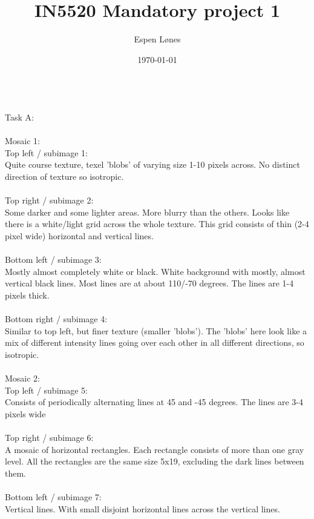 \documentclass[12pt, letterpaper, twoside]{article}
\begin{document}
\title{IN5520 Mandatory project 1}
\author{Espen Lønes}
\date{\today}
\maketitle
\ \\
Task A:\\
\ \\
Mosaic 1:\\
Top left / subimage 1:\\
Quite course texture, texel 'blobs' of varying size 1-10 pixels across. No distinct direction of texture so isotropic.\\
\ \\
Top right / subimage 2:\\
Some darker and some lighter areas. More blurry than the others. Looks like there is a white/light grid across the whole texture. This grid consists of thin (2-4 pixel wide) horizontal and vertical lines.\\
\ \\ 
Bottom left / subimage 3:\\
Mostly almost completely white or black. White background with mostly, almost vertical black lines. Most lines are at about 110/-70 degrees. The lines are 1-4 pixels thick.\\
\ \\    
Bottom right / subimage 4:\\
Similar to top left, but finer texture (smaller 'blobs'). The 'blobs' here look like a mix of different intensity lines going over each other in all different directions, so isotropic.\\
\newpage
\ \\
Mosaic 2:\\
Top left / subimage 5:\\
Consists of periodically alternating lines at 45 and -45 degrees. The lines are 3-4 pixels wide\\
\ \\
Top right / subimage 6:\\
A mosaic of horizontal rectangles. Each rectangle consists of more than one gray level. All the rectangles are the same size 5x19, excluding the dark lines between them.\\
\ \\
Bottom left / subimage 7:\\
Vertical lines. With small disjoint horizontal lines across the vertical lines.\\
\ \\
\end{document}
